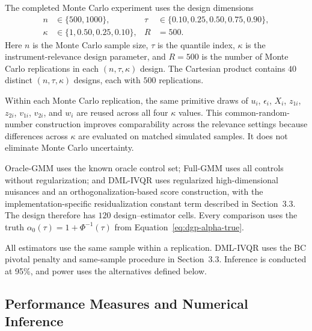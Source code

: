 The completed Monte Carlo experiment uses the design dimensions
\begin{equation}
  \begin{aligned}
    n&\in\{500,1000\},
    &\tau&\in\{0.10,0.25,0.50,0.75,0.90\},\\
    \kappa&\in\{1,0.50,0.25,0.10\},
    &R&=500.
  \end{aligned}
  \label{eq:simulation-design}
\end{equation}
Here $n$ is the Monte Carlo sample size, $\tau$ is the quantile index, $\kappa$ is the instrument-relevance design parameter, and $R=500$ is the number of Monte Carlo replications in each $(n,\tau,\kappa)$ design. The Cartesian product contains $40$ distinct $(n,\tau,\kappa)$ designs, each with $500$ replications.

Within each Monte Carlo replication, the same primitive draws of \(u_i\), \(\epsilon_i\), \(X_i\), \(z_{1i}\), \(z_{2i}\), \(v_{1i}\), \(v_{2i}\), and \(w_i\) are reused across all four \(\kappa\) values. This common-random-number construction improves comparability across the relevance settings because differences across \(\kappa\) are evaluated on matched simulated samples. It does not eliminate Monte Carlo uncertainty.

Oracle-GMM uses the known oracle control set; Full-GMM uses all controls without regularization; and DML-IVQR uses regularized high-dimensional nuisances and an orthogonalization-based score construction, with the implementation-specific residualization constant term described in Section~3.3. The design therefore has $120$ design--estimator cells. Every comparison uses the truth $\alpha_0(\tau)=1+\Phi^{-1}(\tau)$ from Equation~\eqref{eq:dgp-alpha-true}.

All estimators use the same sample within a replication. DML-IVQR uses the BC pivotal penalty and same-sample procedure in Section~3.3. Inference is conducted at 95\%, and power uses the alternatives defined below.

\subsection{Performance Measures and Numerical Inference}
\label{sec:performance-measures}

